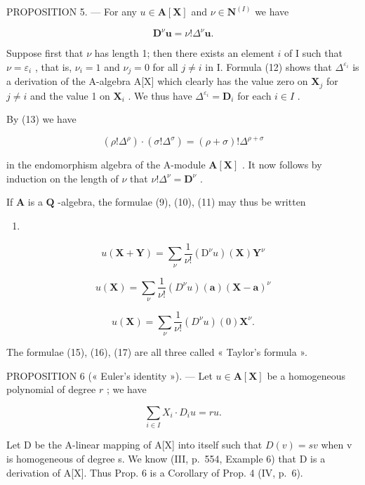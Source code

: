 PROPOSITION 5. --- For any \(u \in \mathbf{A}[\mathbf{X}]\) and \(\nu \in \mathbf{N}^{(I)}\) we have

\[
\mathbf {D} ^ {\nu} \boldsymbol {u} = \nu ! \Delta^ {\nu} \boldsymbol {u}.
\]

Suppose first that \(\nu\) has length 1; then there exists an element \(i\) of I such that \(\nu = \varepsilon_i\) , that is, \(\nu_i = 1\) and \(\nu_j = 0\) for all \(j \neq i\) in I. Formula (12) shows that \(\Delta^{\varepsilon_i}\) is a derivation of the A-algebra A{[}X{]} which clearly has the value zero on \(\mathbf{X}_j\) for \(j \neq i\) and the value 1 on \(\mathbf{X}_i\) . We thus have \(\Delta^{\varepsilon_i} = \mathbf{D}_i\) for each \(i \in I\) .

By (13) we have

\[
(\rho ! \Delta^ {\rho}) \cdot (\sigma ! \Delta^ {\sigma}) = (\rho + \sigma)! \Delta^ {\rho + \sigma}\tag{14}
\]

in the endomorphism algebra of the A-module \(\mathbf{A}[\mathbf{X}]\) . It now follows by induction on the length of \(\nu\) that \(\nu! \Delta^{\nu} = \mathbf{D}^{\nu}\) .

If \(\mathbf{A}\) is a \(\mathbf{Q}\) -algebra, the formulae (9), (10), (11) may thus be written

\begin{enumerate}
\def\labelenumi{(\arabic{enumi})}
\setcounter{enumi}{14}
\tightlist
\item
\end{enumerate}

\[
u (\mathbf {X} + \mathbf {Y}) = \sum_ {\nu} \frac {1}{\nu !} (\mathrm{D} ^ {\nu} u) (\mathbf {X}) \mathbf {Y} ^ {\nu}
\]

\[
u (\mathbf {X}) = \sum_ {\nu} \frac {1}{\nu !} (D ^ {\nu} u) (\mathbf {a}) (\mathbf {X} - \mathbf {a}) ^ {\nu}\tag{16}
\]

\[
u (\mathbf {X}) = \sum_ {\nu} \frac {1}{\nu !} (D ^ {\nu} u) (0) \mathbf {X} ^ {\nu}.\tag{17}
\]

The formulae (15), (16), (17) are all three called « Taylor's formula ».

PROPOSITION 6 (« Euler's identity »). --- Let \(u \in \mathbf{A}[\mathbf{X}]\) be a homogeneous polynomial of degree \(r\) ; we have

\[
\sum_ {i \in I} X _ {i} \cdot D _ {i} u = r u.
\]

Let D be the A-linear mapping of A{[}X{]} into itself such that \(D(v) = sv\) when v is homogeneous of degree s. We know (III, p.~554, Example 6) that D is a derivation of A{[}X{]}. Thus Prop. 6 is a Corollary of Prop. 4 (IV, p.~6).

